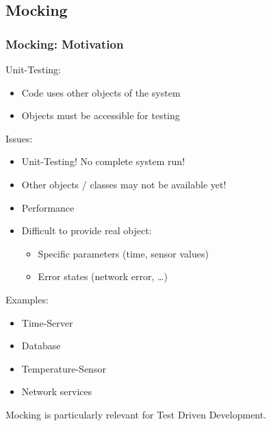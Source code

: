 
\subsection{Mocking}


\begin{frame}[allowframebreaks]
 \frametitle{Mocking: Motivation}
 
Unit-Testing:
\begin{itemize}
   \item Code uses other objects of the system
   \item Objects must be accessible for testing
\end{itemize}
Issues:
 \begin{itemize}
	   \item Unit-Testing! No complete system run!
		 \item Other objects / classes may not be available yet!
		 \item Performance
    \item Difficult to provide real object:
    \begin{itemize}
     \item Specific parameters (time, sensor values)
     \item Error states (network error, \dots)
    \end{itemize}
\end{itemize}

 \pause 
Examples:
\begin{itemize}
   \item Time-Server
   \item Database
   \item Temperature-Sensor
   \item Network services
\end{itemize}

Mocking is particularly relevant for \glqq Test Driven Development\grqq.
\end{frame}


